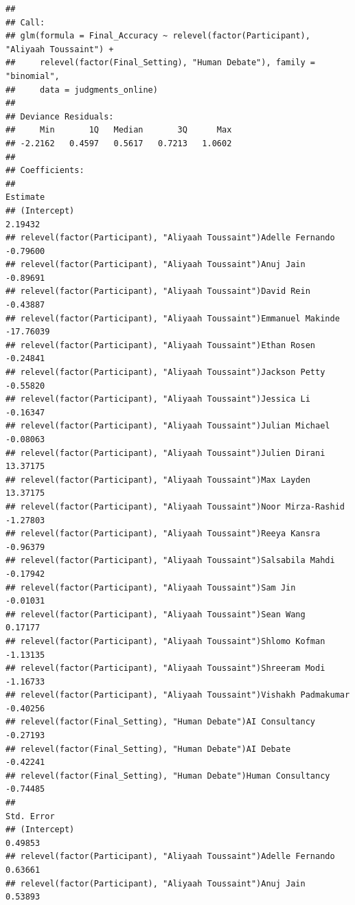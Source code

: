 \documentclass[
]{article}
\begin{document}
\begin{verbatim}
## 
## Call:
## glm(formula = Final_Accuracy ~ relevel(factor(Participant), "Aliyaah Toussaint") + 
##     relevel(factor(Final_Setting), "Human Debate"), family = "binomial", 
##     data = judgments_online)
## 
## Deviance Residuals: 
##     Min       1Q   Median       3Q      Max  
## -2.2162   0.4597   0.5617   0.7213   1.0602  
## 
## Coefficients:
##                                                                       Estimate
## (Intercept)                                                            2.19432
## relevel(factor(Participant), "Aliyaah Toussaint")Adelle Fernando      -0.79600
## relevel(factor(Participant), "Aliyaah Toussaint")Anuj Jain            -0.89691
## relevel(factor(Participant), "Aliyaah Toussaint")David Rein           -0.43887
## relevel(factor(Participant), "Aliyaah Toussaint")Emmanuel Makinde    -17.76039
## relevel(factor(Participant), "Aliyaah Toussaint")Ethan Rosen          -0.24841
## relevel(factor(Participant), "Aliyaah Toussaint")Jackson Petty        -0.55820
## relevel(factor(Participant), "Aliyaah Toussaint")Jessica Li           -0.16347
## relevel(factor(Participant), "Aliyaah Toussaint")Julian Michael       -0.08063
## relevel(factor(Participant), "Aliyaah Toussaint")Julien Dirani        13.37175
## relevel(factor(Participant), "Aliyaah Toussaint")Max Layden           13.37175
## relevel(factor(Participant), "Aliyaah Toussaint")Noor Mirza-Rashid    -1.27803
## relevel(factor(Participant), "Aliyaah Toussaint")Reeya Kansra         -0.96379
## relevel(factor(Participant), "Aliyaah Toussaint")Salsabila Mahdi      -0.17942
## relevel(factor(Participant), "Aliyaah Toussaint")Sam Jin              -0.01031
## relevel(factor(Participant), "Aliyaah Toussaint")Sean Wang             0.17177
## relevel(factor(Participant), "Aliyaah Toussaint")Shlomo Kofman        -1.13135
## relevel(factor(Participant), "Aliyaah Toussaint")Shreeram Modi        -1.16733
## relevel(factor(Participant), "Aliyaah Toussaint")Vishakh Padmakumar   -0.40256
## relevel(factor(Final_Setting), "Human Debate")AI Consultancy          -0.27193
## relevel(factor(Final_Setting), "Human Debate")AI Debate               -0.42241
## relevel(factor(Final_Setting), "Human Debate")Human Consultancy       -0.74485
##                                                                     Std. Error
## (Intercept)                                                            0.49853
## relevel(factor(Participant), "Aliyaah Toussaint")Adelle Fernando       0.63661
## relevel(factor(Participant), "Aliyaah Toussaint")Anuj Jain             0.53893

\end{verbatim}
\end{document}
